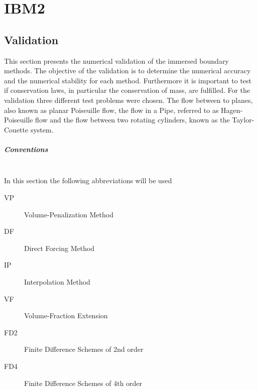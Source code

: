 \chapter{IBM2}
\clearpage
\section{Validation}

This section presents the numerical validation of the immersed boundary methods.
The objective of the validation is to determine the numerical accuracy and
the numerical stability for each method.
Furthermore it is important to test if conservation laws, in particular the conservation of mass,
are fulfilled.
For the validation three different test problems were chosen.
The flow between to planes, also known as planar Poiseuille flow, the flow in a Pipe, referred to as Hagen-Poiseuille flow and the flow
between two rotating cylinders, known as the Taylor-Couette system.

\paragraph{Conventions}\mbox{}\\

In this section the following abbreviations will be used

\begin{multicols}{2}
\begin{description}
    \item[VP]{Volume-Penalization Method}
    \item[DF]{Direct Forcing Method}
    \item[IP]{Interpolation Method}
    \item[VF]{Volume-Fraction Extension}
    \item[FD2]{Finite Difference Schemes of 2nd order}
    \item[FD4]{Finite Difference Schemes of 4th order}
\end{description}
\end{multicols}

